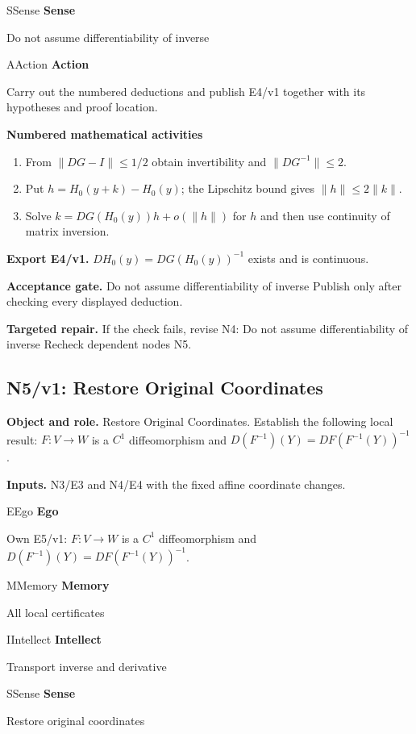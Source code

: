 \documentclass[preprint,12pt,aps,pra,showkeys,amsmath,amssymb,superscriptaddress,floatfix]{revtex4-2}
\theoremstyle{definition}
\theoremstyle{remark}
\newcommand{\mmfaculty}[3]{%
 \begin{mmfacultybox}{#1}{#2}
 {\sffamily\bfseries\color{MMBlue}#2}\par\smallskip #3
 \end{mmfacultybox}}
\newcommand{\field}[2]{\par\smallskip\noindent\textbf{#1.} #2\par}
\begin{document}
\mmfaculty{S}{Sense}{Do not assume differentiability of inverse}

\mmfaculty{A}{Action}{Carry out the numbered deductions and publish E4/v1 together with its
hypotheses and proof location.}

\smallskip\noindent\textbf{Numbered mathematical activities}

\begin{enumerate}[label=N4.\arabic*,leftmargin=3.4em]

\item From \(\|DG-I\|\le1/2\) obtain invertibility and \(\|DG^{-1}\|\le2\).

\item Put \(h=H_0(y+k)-H_0(y)\); the Lipschitz bound gives \(\|h\|\le2\|k\|\).

\item Solve \(k=DG(H_0(y))h+o(\|h\|)\) for \(h\) and then use continuity of
matrix inversion.

\end{enumerate}

\field{Export E4/v1}{\(DH_0(y)=DG(H_0(y))^{-1}\) exists and is continuous.}

\field{Acceptance gate}{Do not assume differentiability of inverse Publish only after checking
every displayed deduction.}

\field{Targeted repair}{If the check fails, revise N4: Do not assume differentiability of
inverse Recheck dependent nodes N5.}

\clearpage

\subsection{N5/v1: Restore Original Coordinates}

\field{Object and role}{Restore Original Coordinates. Establish the following local result:
\(F:V\to W\) is a \(C^1\) diffeomorphism and
\(D(F^{-1})(Y)=DF(F^{-1}(Y))^{-1}\).}

\field{Inputs}{N3/E3 and N4/E4 with the fixed affine coordinate changes.}

\mmfaculty{E}{Ego}{Own E5/v1: \(F:V\to W\) is a \(C^1\) diffeomorphism and
\(D(F^{-1})(Y)=DF(F^{-1}(Y))^{-1}\).}

\mmfaculty{M}{Memory}{All local certificates}

\mmfaculty{I}{Intellect}{Transport inverse and derivative}

\mmfaculty{S}{Sense}{Restore original coordinates}
\end{document}
